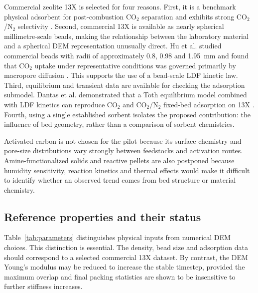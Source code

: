 \documentclass[12pt,a4paper]{article}
\begin{document}
Commercial zeolite 13X is selected for four reasons. First, it is a benchmark
physical adsorbent for post-combustion CO$_2$ separation and exhibits strong
CO$_2$/N$_2$ selectivity \cite{Dantas2011,Hu2014}. Second, commercial 13X is
available as nearly spherical millimetre-scale beads, making the relationship
between the laboratory material and a spherical DEM representation unusually
direct. Hu et al. studied commercial beads with radii of approximately 0.8,
0.98 and 1.95~mm and found that CO$_2$ uptake under representative conditions
was governed primarily by macropore diffusion \cite{Hu2014}. This supports the
use of a bead-scale LDF kinetic law. Third, equilibrium and transient data are
available for checking the adsorption submodel. Dantas et al. demonstrated
that a Toth equilibrium model combined with LDF kinetics can reproduce CO$_2$
and CO$_2$/N$_2$ fixed-bed adsorption on 13X \cite{Dantas2011}. Fourth, using a
single established sorbent isolates the proposed contribution: the influence
of bed geometry, rather than a comparison of sorbent chemistries.

Activated carbon is not chosen for the pilot because its surface chemistry and
pore-size distributions vary strongly between feedstocks and activation
routes. Amine-functionalized solids and reactive pellets are also postponed
because humidity sensitivity, reaction kinetics and thermal effects would make
it difficult to identify whether an observed trend comes from bed structure or
material chemistry.

\subsection{Reference properties and their status}

Table~\ref{tab:parameters} distinguishes physical inputs from numerical DEM
choices. This distinction is essential. The density, bead size and adsorption
data should correspond to a selected commercial 13X dataset. By contrast, the
DEM Young's modulus may be reduced to increase the stable timestep, provided
the maximum overlap and final packing statistics are shown to be insensitive
to further stiffness increases.
\end{document}
